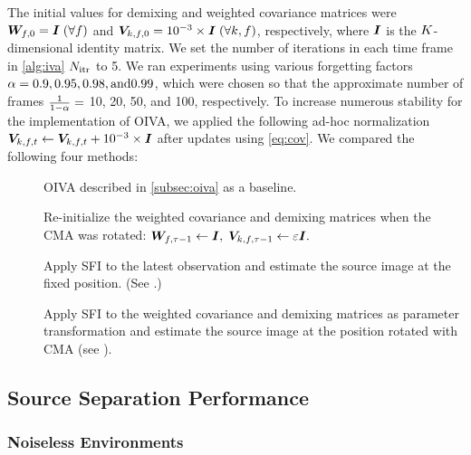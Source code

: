 \documentclass[sip,biber]{now-journal}
\begin{document}
The initial values for demixing and weighted covariance matrices were
$\bm{W} _{f,0} = \bm{I}\; (\forall f)$ and $\bm{V} _{k,f,0} = 10^{-3} \times \bm{I}\; (\forall k, f)$, respectively, where $\bm{I}$ is the $K$-dimensional identity matrix.
We set the number of iterations in each time frame in \cref{alg:iva} $N _{\mathrm{itr}}$ to 5.
We ran experiments using various forgetting factors $\alpha = 0.9, 0.95, 0.98, \text{and} 0.99$,
which were chosen so that the approximate number of frames $\frac{1}{1 - \alpha} =$ 10, 20, 50, and 100, respectively.
To increase numerous stability for the implementation of OIVA,
we applied the following ad-hoc normalization $\cov _{\src,\ft} \gets \cov _{\src,\ft} + 10 ^{-3} \times \Eye$ after updates using \eqref{eq:cov}.
We compared the following four methods:
\begin{description}
  \item[\NaiveIVA] OIVA described in \cref{subsec:oiva} as a baseline.
  \item[\ResetIVA] Re-initialize the weighted covariance and demixing matrices when the CMA was rotated:
      $\bm{W} _{f,\tau - 1} \gets \bm{I}, \; \bm{V} _{k,f,\tau - 1} \gets \varepsilon \bm{I}.$
  \item[\SFIIVAo] Apply SFI to the latest observation and estimate the source image at the fixed position. (See .)
  \item[\SFIIVAm] Apply SFI to the weighted covariance and demixing matrices as parameter transformation and estimate the source image at the position rotated with CMA (see ).
\end{description}

\subsection{Source Separation Performance}
\subsubsection{Noiseless Environments}
\end{document}
